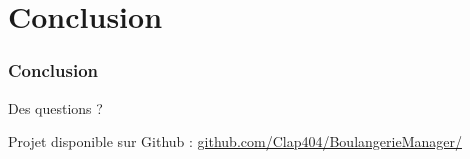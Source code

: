     \section{Conclusion}


\begin{frame}
\frametitle{Conclusion}
\centering \Large{Des questions ?\\[2em]}

\small{Projet disponible sur Github :}
{\color{blue}\url{github.com/Clap404/BoulangerieManager/}}
\end{frame}
